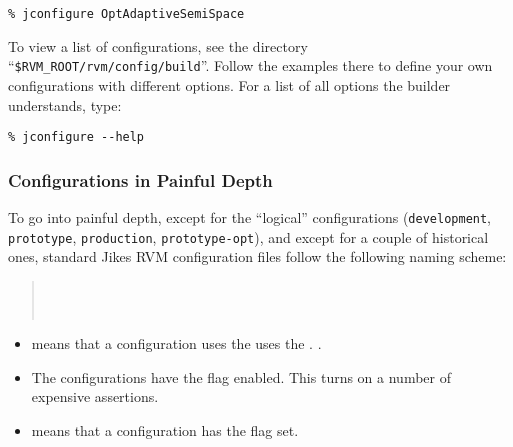 \begin{verbatim}
% jconfigure OptAdaptiveSemiSpace
\end{verbatim}

To view a list of configurations, see the directory
``\texttt{\$RVM\_\-ROOT\-/\-rvm\-/\-con\-fig\-/\-build}''.  Follow the
examples there to define your own configurations with different options. 
For a list of all options the builder understands, type:
\begin{verbatim}
% jconfigure --help
\end{verbatim}

\subsubsection{Configurations in Painful Depth}
To go into painful depth, except for the ``logical'' configurations
(\texttt{development}, 
\texttt{prototype}, \texttt{production}, \texttt{prototype-opt}), and
except for a couple of historical ones, standard Jikes\TMweb{} RVM configuration
files follow the following naming scheme:
\begin{verse}
        \\
  \Mlbr{}  \Mor{}
  \Mrbr{} \\
         
\end{verse}

\begin{itemize}
\item {} means that a configuration uses the
        uses the .  
        .  

\item The  configurations have the
           flag
          enabled.  This turns on a number of expensive assertions.

\item {} means that a configuration has the
           flag set.


\end{itemize}

